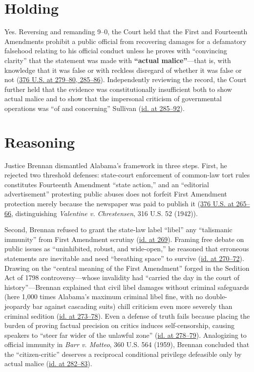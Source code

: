 \documentclass[12pt]{article}
\begin{document}
\section{Holding}
Yes. Reversing and remanding 9--0, the Court held that the First and Fourteenth Amendments prohibit a public official from recovering damages for a defamatory falsehood relating to his official conduct unless he proves with ``convincing clarity'' that the statement was made with \textbf{``actual malice''}---that is, with knowledge that it was false or with reckless disregard of whether it was false or not (\href{https://supreme.justia.com/cases/federal/us/376/254/}{376 U.S. at 279--80, 285--86}). Independently reviewing the record, the Court further held that the evidence was constitutionally insufficient both to show actual malice and to show that the impersonal criticism of governmental operations was ``of and concerning'' Sullivan (\href{https://www.law.cornell.edu/supremecourt/text/376/254}{id. at 285--92}).

\section{Reasoning}
Justice Brennan dismantled Alabama's framework in three steps. First, he rejected two threshold defenses: state-court enforcement of common-law tort rules constitutes Fourteenth Amendment ``state action,'' and an ``editorial advertisement'' protesting public abuses does not forfeit First Amendment protection merely because the newspaper was paid to publish it (\href{https://supreme.justia.com/cases/federal/us/376/254/}{376 U.S. at 265--66}, distinguishing \textit{Valentine v. Chrestensen}, 316 U.S. 52 (1942)).

Second, Brennan refused to grant the state-law label ``libel'' any ``talismanic immunity'' from First Amendment scrutiny (\href{https://supreme.justia.com/cases/federal/us/376/254/}{id. at 269}). Framing free debate on public issues as ``uninhibited, robust, and wide-open,'' he reasoned that erroneous statements are inevitable and need ``breathing space'' to survive (\href{https://supreme.justia.com/cases/federal/us/376/254/}{id. at 270--72}). Drawing on the ``central meaning of the First Amendment'' forged in the Sedition Act of 1798 controversy---whose invalidity had ``carried the day in the court of history''---Brennan explained that civil libel damages without criminal safeguards (here 1,000 times Alabama's maximum criminal libel fine, with no double-jeopardy bar against cascading suits) chill criticism even more severely than criminal sedition (\href{https://www.law.cornell.edu/supremecourt/text/376/254}{id. at 273--78}). Even a defense of truth fails because placing the burden of proving factual precision on critics induces self-censorship, causing speakers to ``steer far wider of the unlawful zone'' (\href{https://supreme.justia.com/cases/federal/us/376/254/}{id. at 278--79}). Analogizing to official immunity in \textit{Barr v. Matteo}, 360 U.S. 564 (1959), Brennan concluded that the ``citizen-critic'' deserves a reciprocal conditional privilege defeasible only by actual malice (\href{https://supreme.justia.com/cases/federal/us/376/254/}{id. at 282--83}).
\end{document}
